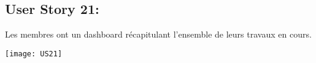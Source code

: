 \newpage{}
\subsection{User Story 21:}
Les membres ont un dashboard récapitulant l'ensemble de leurs travaux en cours.	


  \begin{center}
        \texttt{[image: US21]}
  \end{center}